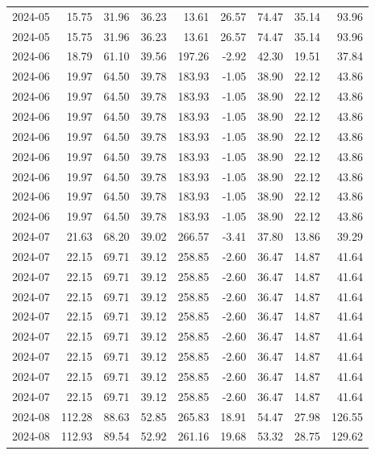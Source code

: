 \begin{table}[ht]
\begin{tabular}{lrrrrrrrr}
  2024-05 & 15.75 & 31.96 & 36.23 & 13.61 & 26.57 & 74.47 & 35.14 & 93.96 \\ 
  2024-05 & 15.75 & 31.96 & 36.23 & 13.61 & 26.57 & 74.47 & 35.14 & 93.96 \\ 
  2024-06 & 18.79 & 61.10 & 39.56 & 197.26 & -2.92 & 42.30 & 19.51 & 37.84 \\ 
  2024-06 & 19.97 & 64.50 & 39.78 & 183.93 & -1.05 & 38.90 & 22.12 & 43.86 \\ 
  2024-06 & 19.97 & 64.50 & 39.78 & 183.93 & -1.05 & 38.90 & 22.12 & 43.86 \\ 
  2024-06 & 19.97 & 64.50 & 39.78 & 183.93 & -1.05 & 38.90 & 22.12 & 43.86 \\ 
  2024-06 & 19.97 & 64.50 & 39.78 & 183.93 & -1.05 & 38.90 & 22.12 & 43.86 \\ 
  2024-06 & 19.97 & 64.50 & 39.78 & 183.93 & -1.05 & 38.90 & 22.12 & 43.86 \\ 
  2024-06 & 19.97 & 64.50 & 39.78 & 183.93 & -1.05 & 38.90 & 22.12 & 43.86 \\ 
  2024-06 & 19.97 & 64.50 & 39.78 & 183.93 & -1.05 & 38.90 & 22.12 & 43.86 \\ 
  2024-06 & 19.97 & 64.50 & 39.78 & 183.93 & -1.05 & 38.90 & 22.12 & 43.86 \\ 
  2024-07 & 21.63 & 68.20 & 39.02 & 266.57 & -3.41 & 37.80 & 13.86 & 39.29 \\ 
  2024-07 & 22.15 & 69.71 & 39.12 & 258.85 & -2.60 & 36.47 & 14.87 & 41.64 \\ 
  2024-07 & 22.15 & 69.71 & 39.12 & 258.85 & -2.60 & 36.47 & 14.87 & 41.64 \\ 
  2024-07 & 22.15 & 69.71 & 39.12 & 258.85 & -2.60 & 36.47 & 14.87 & 41.64 \\ 
  2024-07 & 22.15 & 69.71 & 39.12 & 258.85 & -2.60 & 36.47 & 14.87 & 41.64 \\ 
  2024-07 & 22.15 & 69.71 & 39.12 & 258.85 & -2.60 & 36.47 & 14.87 & 41.64 \\ 
  2024-07 & 22.15 & 69.71 & 39.12 & 258.85 & -2.60 & 36.47 & 14.87 & 41.64 \\ 
  2024-07 & 22.15 & 69.71 & 39.12 & 258.85 & -2.60 & 36.47 & 14.87 & 41.64 \\ 
  2024-07 & 22.15 & 69.71 & 39.12 & 258.85 & -2.60 & 36.47 & 14.87 & 41.64 \\ 
  2024-08 & 112.28 & 88.63 & 52.85 & 265.83 & 18.91 & 54.47 & 27.98 & 126.55 \\ 
  2024-08 & 112.93 & 89.54 & 52.92 & 261.16 & 19.68 & 53.32 & 28.75 & 129.62 \\ 

\end{tabular}
\end{table}
